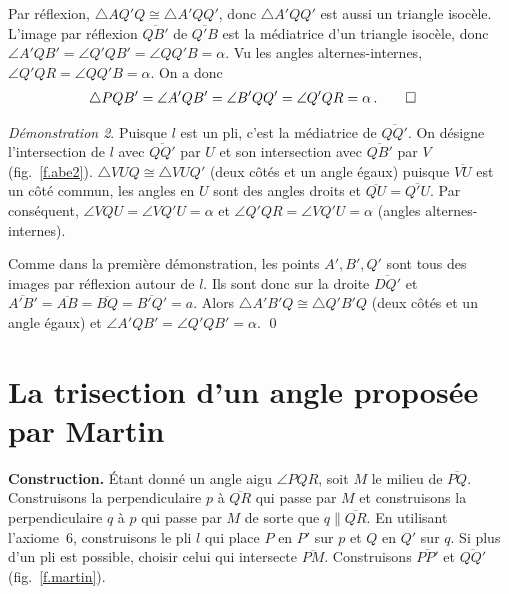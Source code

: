 Par réflexion, $\triangle AQ'Q\cong \triangle A'QQ'$, donc $\triangle A'QQ'$ est aussi un triangle isocèle.
 L'image par réflexion $\overline{QB'}$ de  $\overline{Q'B}$ est la médiatrice d'un triangle isocèle, donc $\angle A'QB'=\angle Q'QB'=\angle QQ'B=\alpha$.
Vu les angles alternes-internes, $\angle Q'QR=\angle QQ'B=\alpha$.
On a donc 
\begin{align*}
\triangle PQB'&=\angle A'QB'=\angle B'QQ'=\angle Q'QR=\alpha\,.
\qed 
\end{align*}

\noindent \emph{Démonstration  2}.
Puisque $l$ est un pli, c'est la médiatrice de $\overline{QQ'}$. On désigne l'intersection de $l$ avec $\overline{QQ'}$ par $U$ et son intersection avec $\overline{QB'}$ par $V$ (fig.~\ref{f.abe2}). $\triangle VUQ\cong \triangle VUQ'$ (deux côtés et un angle égaux) puisque $\overline{VU}$ est un côté commun, les angles en $U$ sont des angles droits et $\overline{QU}=\overline{Q'U}$. Par conséquent, $\angle VQU=\angle VQ'U=\alpha$ et $\angle Q'QR=\angle VQ'U=\alpha$ (angles alternes-internes).

Comme dans la première démonstration, les points  $A', B', Q'$ sont tous des images par réflexion autour de $l$. Ils sont donc sur la droite $\overline{DQ'}$ et $\overline{A'B'}=\overline{AB}=\overline{BQ}=\overline{B'Q'}=a$. Alors $\triangle A'B'Q\cong\triangle Q'B'Q$ (deux côtés et un angle égaux) et $\angle A'QB'=\angle Q'QB'=\alpha$.
\qed



\section{La trisection d'un angle proposée par Martin}\label{s.martin-trisection}


\noindent\textbf{Construction.}
Étant donné un angle aigu $\angle PQR$, soit $M$ le milieu de $\overline{PQ}$. Construisons  la perpendiculaire $p$ à $\overline{QR}$ qui passe par $M$ et construisons  la perpendiculaire $q$ à $p$ qui passe par $M$ de sorte que $q\parallel\overline{QR}$. En utilisant l'axiome~6, construisons le pli $l$ qui place $P$ en $P'$ sur $p$ et $Q$ en $Q'$ sur $q$. Si plus d'un pli est possible, choisir celui qui intersecte $\overline{PM}$. Construisons $\overline{PP'}$ et $\overline{QQ'}$   (fig.~\ref{f.martin}).

